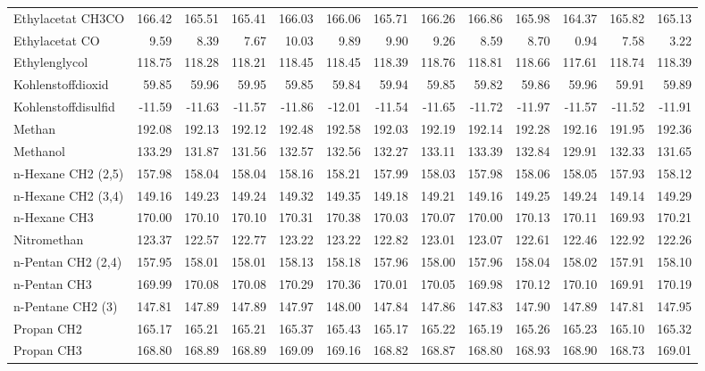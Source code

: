 \begin{table}[ht!]
{\begin{tabular}{lrrrrrrrrrrrr}
    Ethylacetat CH3CO & 166.42 & 165.51 & 165.41 & 166.03 & 166.06 & 165.71 & 166.26 & 166.86 & 165.98 & 164.37 & 165.82 & 165.13 \\
    Ethylacetat CO & 9.59  & 8.39  & 7.67  & 10.03 & 9.89  & 9.90  & 9.26  & 8.59  & 8.70  & 0.94  & 7.58  & 3.22 \\
    Ethylenglycol & 118.75 & 118.28 & 118.21 & 118.45 & 118.45 & 118.39 & 118.76 & 118.81 & 118.66 & 117.61 & 118.74 & 118.39 \\
    Kohlenstoffdioxid & 59.85 & 59.96 & 59.95 & 59.85 & 59.84 & 59.94 & 59.85 & 59.82 & 59.86 & 59.96 & 59.91 & 59.89 \\
    Kohlenstoffdisulfid & -11.59 & -11.63 & -11.57 & -11.86 & -12.01 & -11.54 & -11.65 & -11.72 & -11.97 & -11.57 & -11.52 & -11.91 \\
    Methan & 192.08 & 192.13 & 192.12 & 192.48 & 192.58 & 192.03 & 192.19 & 192.14 & 192.28 & 192.16 & 191.95 & 192.36 \\
    Methanol & 133.29 & 131.87 & 131.56 & 132.57 & 132.56 & 132.27 & 133.11 & 133.39 & 132.84 & 129.91 & 132.33 & 131.65 \\
    n-Hexane CH2 (2,5) & 157.98 & 158.04 & 158.04 & 158.16 & 158.21 & 157.99 & 158.03 & 157.98 & 158.06 & 158.05 & 157.93 & 158.12 \\
    n-Hexane CH2 (3,4) & 149.16 & 149.23 & 149.24 & 149.32 & 149.35 & 149.18 & 149.21 & 149.16 & 149.25 & 149.24 & 149.14 & 149.29 \\
    n-Hexane CH3 & 170.00 & 170.10 & 170.10 & 170.31 & 170.38 & 170.03 & 170.07 & 170.00 & 170.13 & 170.11 & 169.93 & 170.21 \\
    Nitromethan & 123.37 & 122.57 & 122.77 & 123.22 & 123.22 & 122.82 & 123.01 & 123.07 & 122.61 & 122.46 & 122.92 & 122.26 \\
    n-Pentan CH2 (2,4) & 157.95 & 158.01 & 158.01 & 158.13 & 158.18 & 157.96 & 158.00 & 157.96 & 158.04 & 158.02 & 157.91 & 158.10 \\
    n-Pentan CH3 & 169.99 & 170.08 & 170.08 & 170.29 & 170.36 & 170.01 & 170.05 & 169.98 & 170.12 & 170.10 & 169.91 & 170.19 \\
    n-Pentane CH2 (3)  & 147.81 & 147.89 & 147.89 & 147.97 & 148.00 & 147.84 & 147.86 & 147.83 & 147.90 & 147.89 & 147.81 & 147.95 \\
    Propan CH2 & 165.17 & 165.21 & 165.21 & 165.37 & 165.43 & 165.17 & 165.22 & 165.19 & 165.26 & 165.23 & 165.10 & 165.32 \\
    Propan CH3 & 168.80 & 168.89 & 168.89 & 169.09 & 169.16 & 168.82 & 168.87 & 168.80 & 168.93 & 168.90 & 168.73 & 169.01 \\

\end{tabular}}
\end{table}
